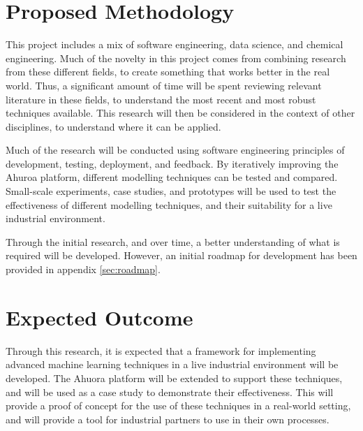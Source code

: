 \documentclass[12pt]{article}
\begin{document}
\section{Proposed Methodology}

This project includes a mix of software engineering, data science, and chemical engineering. Much of the novelty in this project comes from combining research from these different fields, to create something that works better in the real world. Thus, a significant amount of time will be spent reviewing relevant literature in these fields, to understand the most recent and most robust techniques available. This research will then be considered in the context of other disciplines, to understand where it can be applied.

Much of the research will be conducted using software engineering principles of development, testing, deployment, and feedback. By iteratively improving the Ahuroa platform, different modelling techniques can be tested and compared. Small-scale experiments, case studies, and prototypes will be used to test the effectiveness of different modelling techniques, and their suitability for a live industrial environment.

Through the initial research, and over time, a better understanding of what is required will be developed. However, an initial roadmap for development has been provided in appendix \ref{sec:roadmap}.

\section{Expected Outcome}

Through this research, it is expected that a framework for implementing advanced machine learning techniques in a live industrial environment will be developed. The Ahuora platform will be extended to support these techniques, and will be used as a case study to demonstrate their effectiveness. This will provide a proof of concept for the use of these techniques in a real-world setting, and will provide a tool for industrial partners to use in their own processes.



\end{document}
